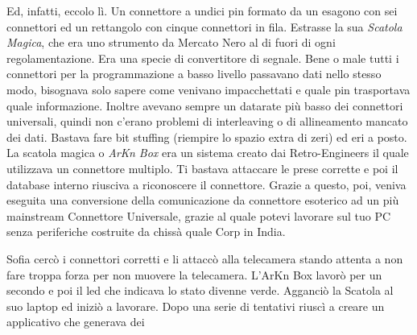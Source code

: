     Ed, infatti, eccolo lì. Un connettore a undici pin formato da un esagono con sei connettori ed un rettangolo con
    cinque connettori in fila. Estrasse la sua \emph{Scatola Magica}, che era uno strumento da Mercato Nero al di fuori
    di ogni regolamentazione. Era una specie di convertitore di segnale. Bene o male tutti i connettori per la
    programmazione a basso livello passavano dati nello stesso modo, bisognava solo sapere come venivano impacchettati e
    quale pin trasportava quale informazione. Inoltre avevano sempre un datarate più basso dei connettori universali,
    quindi non c'erano problemi di interleaving o di allineamento mancato dei dati. Bastava fare bit stuffing (riempire
    lo spazio extra di zeri) ed eri a posto. La scatola magica o \emph{ArKn Box} era un sistema creato dai
    Retro-Engineers il quale utilizzava un connettore multiplo. Ti bastava attaccare le prese corrette e poi il database
    interno riusciva a riconoscere il connettore. Grazie a questo, poi, veniva eseguita una conversione della
    comunicazione da connettore esoterico ad un più mainstream Connettore Universale, grazie al quale potevi lavorare
    sul tuo PC senza periferiche costruite da chissà quale Corp in India.

    Sofia cercò i connettori corretti e li attaccò alla telecamera stando attenta a non fare troppa forza per non
    muovere la telecamera. L'ArKn Box lavorò per un secondo e poi il led che indicava lo stato divenne verde. Agganciò
    la Scatola al suo laptop ed iniziò a lavorare. Dopo una serie di tentativi riuscì a creare un applicativo che
    generava dei 
